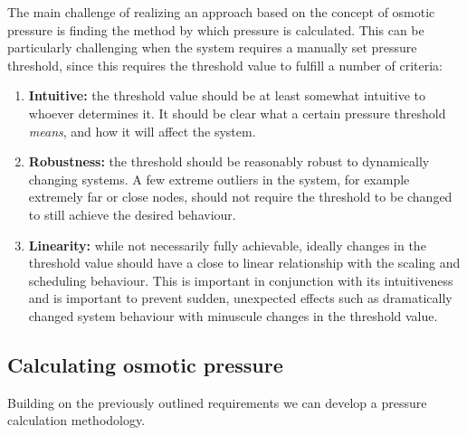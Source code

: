 The main challenge of realizing an approach based on the concept of osmotic pressure is finding the method by which pressure is calculated. This can be particularly challenging when the system requires a manually set pressure threshold, since this requires the threshold value to fulfill a number of criteria:
\begin{enumerate}
    \item \textbf{Intuitive:} the threshold value should be at least somewhat intuitive to whoever determines it. It should be clear what a certain pressure threshold \textit{means}, and how it will affect the system.
    \item \textbf{Robustness:} the threshold should be reasonably robust to dynamically changing systems. A few extreme outliers in the system, for example extremely far or close nodes, should not require the threshold to be changed to still achieve the desired behaviour.
    \item \textbf{Linearity:} while not necessarily fully achievable, ideally changes in the threshold value should have a close to linear relationship with the scaling and scheduling behaviour. This is important in conjunction with its intuitiveness and is important to prevent sudden, unexpected effects such as dramatically changed system behaviour with minuscule changes in the threshold value.
\end{enumerate}

\subsection{Calculating osmotic pressure}
Building on the previously outlined requirements we can develop a pressure calculation methodology.
